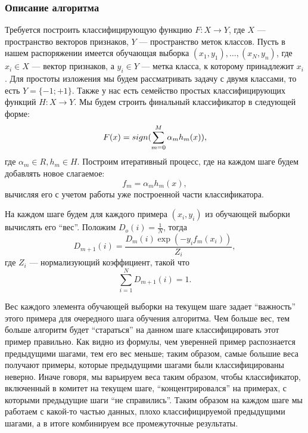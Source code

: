 \subsubsection{Описание алгоритма}
Требуется построить классифицирующую функцию $F : X \to Y$, где $X$ --- пространство векторов признаков, $Y$ --- пространство меток классов. Пусть в нашем распоряжении имеется обучающая выборка $(x_1, y_1), \dots, (x_N, y_n)$, где $x_i \in X$ --- вектор признаков, а $y_i \in Y$ --- метка класса, к которому принадлежит $x_i$. Для простоты изложения мы будем рассматривать задачу с двумя классами, то есть $Y = \lbrace-1; +1\rbrace$. Также у нас есть семейство простых классифицирующих функций $H: X \to Y$. Мы будем строить финальный классификатор в следующей форме:
\begin{displaymath}
  F(x) = sign(\sum_{m=0}^M{\alpha_mh_m(x)}),
\end{displaymath}
где $\alpha_m \in R, h_m \in H.$ Построим итеративный процесс, где на каждом шаге будем добавлять новое слагаемое:
\begin{displaymath}
  f_m = \alpha_mh_m(x),
\end{displaymath}
вычисляя его с учетом работы уже построенной части классификатора.

На каждом шаге будем для каждого примера $(x_i, y_i)$ из обучающей выборки вычислять его ``вес''. Положим $D_o(i) = \frac{1}{N}$, тогда
\begin{displaymath}
  D_{m + 1}(i) = \frac{D_m(i)\exp{(-y_if_m(x_i))}}{Z_i},
\end{displaymath}
где $Z_i$ --- нормализующий коэффициент, такой что
\begin{displaymath}
  \sum_{i = 1}^N{D_{m + 1}(i)} = 1.
\end{displaymath}

Вес каждого элемента обучающей выборки на текущем шаге задает ``важность'' этого примера для очередного шага обучения алгоритма. Чем больше вес, тем больше алгоритм будет ``стараться'' на данном шаге классифицировать этот пример правильно. Как видно из формулы, чем уверенней пример распознается предыдущими шагами, тем его вес меньше; таким образом, самые большие веса получают примеры, которые предыдущими шагами были классифицированы неверно. Иначе говоря, мы варьируем веса таким образом, чтобы классификатор, включенный в комитет на текущем шаге, ``концентрировался'' на примерах,  с которыми предыдущие шаги ``не справились''. Таким образом на каждом шаге мы работаем с какой-то частью данных, плохо классифицируемой предыдущими шагами, а в итоге комбинируем все промежуточные результаты.

